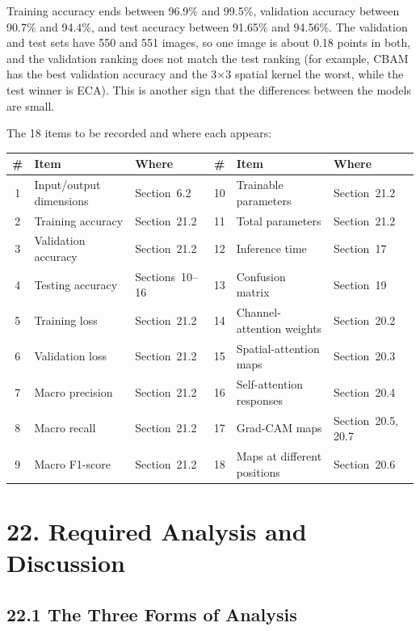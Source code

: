 \documentclass[11pt]{article}
\begin{document}
Training accuracy ends between 96.9\% and 99.5\%, validation accuracy between
90.7\% and 94.4\%, and test accuracy between 91.65\% and 94.56\%. The validation
and test sets have 550 and 551 images, so one image is about 0.18 points in
both, and the validation ranking does not match the test ranking (for
example, CBAM has the best validation accuracy and the 3$\times$3 spatial
kernel the worst, while the test winner is ECA). This is another sign that
the differences between the models are small.

The 18 items to be recorded and where each appears:

\begin{center}
\small
\begin{tabular}{|c|l|l|c|l|l|}
\hline
\# & Item & Where & \# & Item & Where\\
\hline
1 & Input/output dimensions & Section~6.2 & 10 & Trainable parameters & Section~21.2\\
2 & Training accuracy & Section~21.2 & 11 & Total parameters & Section~21.2\\
3 & Validation accuracy & Section~21.2 & 12 & Inference time & Section~17\\
4 & Testing accuracy & Sections~10--16 & 13 & Confusion matrix & Section~19\\
5 & Training loss & Section~21.2 & 14 & Channel-attention weights & Section~20.2\\
6 & Validation loss & Section~21.2 & 15 & Spatial-attention maps & Section~20.3\\
7 & Macro precision & Section~21.2 & 16 & Self-attention responses & Section~20.4\\
8 & Macro recall & Section~21.2 & 17 & Grad-CAM maps & Section~20.5, 20.7\\
9 & Macro F1-score & Section~21.2 & 18 & Maps at different positions & Section~20.6\\
\hline
\end{tabular}
\end{center}


\section*{22. Required Analysis and Discussion}

\subsection*{22.1 The Three Forms of Analysis}
\end{document}
